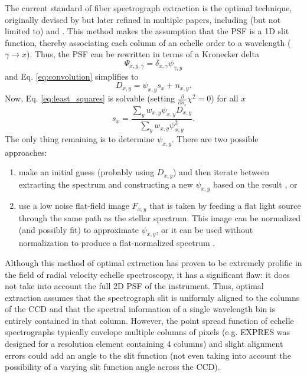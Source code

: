 \documentclass[11pt]{article}
\begin{document}
The current standard of fiber spectrograph extraction is the optimal technique, originally devised by \citet{Horne1986} but later refined in multiple papers, including (but not limited to) \citet{Piskunov2002} and \citet{Zechmeister2013}. This method makes the assumption that the PSF is a 1D slit function, thereby associating each column of an echelle order to a wavelength ($\gamma \rightarrow x$). Thus, the PSF can be rewritten in terms of a Kronecker delta
\begin{equation}
    \Psi_{x,y,\gamma} = \delta_{x,\gamma}\psi_{\gamma,y}
\label{eq:psf_optimal}
\end{equation}
and Eq. \ref{eq:convolution} simplifies to
\begin{equation}
    D_{x,y} = \psi_{x,y} s_x + n_{x,y}.
\end{equation}
Now, Eq. \ref{eq:least_squares} is solvable (setting $\frac{\partial}{\partial s_x} \chi^2 = 0$) for all $x$
\begin{equation}
    s_x = \frac{\sum_y w_{x,y} \psi_{x,y} D_{x,y}}{\sum_y w_{x,y} \psi^2_{x,y}}.
\end{equation}
The only thing remaining is to determine $\psi_{x,y}$. There are two possible approaches:
\begin{enumerate}
    \item make an initial guess (probably using $D_{x,y}$) and then iterate between extracting the spectrum and constructing a new $\psi_{x,y}$ based on the result \citep{Horne1986, Piskunov2002}, or
    \item use a low noise flat-field image $F_{x,y}$ that is taken by feeding a flat light source through the same path as the stellar spectrum. This image can be normalized (and possibly fit) to approximate $\psi_{x,y}$, or it can be used without normalization to produce a flat-normalized spectrum \citep{Zechmeister2013}.
\end{enumerate}

Although this method of optimal extraction has proven to be extremely prolific in the field of radial velocity echelle spectroscopy, it has a significant flaw: it does not take into account the full 2D PSF of the instrument. Thus, optimal extraction assumes that the spectrograph slit is uniformly aligned to the columns of the CCD and that the spectral information of a single wavelength bin is entirely contained in that column. However, the point spread function of echelle spectrographs typically envelope multiple columns of pixels (e.g. EXPRES was designed for a resolution element containing 4 columns) and slight alignment errors could add an angle to the slit function (not even taking into account the possibility of a varying slit function angle across the CCD).
\end{document}
